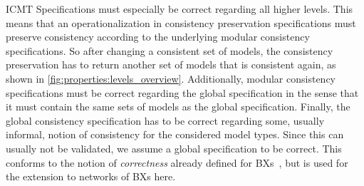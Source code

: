 \begin{copiedFrom}{ICMT}
Specifications must especially be correct regarding all higher levels.
This means that an operationalization in consistency preservation specifications must preserve consistency according to the underlying modular consistency specifications.
So after changing a consistent set of models, the consistency preservation has to return another set of models that is consistent again, as shown in \autoref{fig:properties:levels_overview}.
Additionally, modular consistency specifications must be correct regarding the global specification in the sense that it must contain the same sets of models as the global specification. %
Finally, the global consistency specification has to be correct regarding some, usually informal, notion of consistency for the considered model types.
Since this can usually not be validated, we assume a global specification to be correct. %
This conforms to the notion of \emph{correctness} already defined for \acp{BX}~\cite{stevens2010sosym}, but is used for the extension to networks of \acp{BX} here.





\end{copiedFrom}

